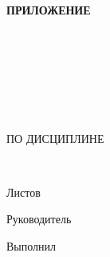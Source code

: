 \begin{ESKDtitlePage}
    \begin{flushright}
        \textbf{ПРИЛОЖЕНИЕ \envPrilLetter} \enspace\enspace
    \end{flushright}
    \begin{center}
        \envEducation \\
        \envUniversity \\
        \envCathedra \\
    \end{center}

    \vfill

    \begin{center}
        \textbf{\envTopic} \\
    \end{center}

    \vfill

    \begin{center}
        \envDocumentTopic \\
        ПО ДИСЦИПЛИНЕ \envDiscipline \\
    \end{center}

    \vfill

    \begin{center}
        \textbf{\envCode} \\
    \end{center}

    \begin{flushright}
        \begin{minipage}[t]{.45\textwidth}
            Листов \pageref{LastPage} \\
        \end{minipage}
    \end{flushright}

    \vfill

    \begin{flushright}
        \begin{minipage}[t]{.49\textwidth}
            \begin{minipage}[t]{.75\textwidth}
                \begin{flushright}
                    Руководитель

                    \hspace{0pt}

                    Выполнил



\end{flushright}
\end{minipage}
\end{minipage}
\end{flushright}
\end{ESKDtitlePage}
